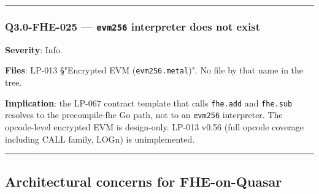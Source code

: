 \documentclass[
]{article}
\begin{document}
\begin{center}\rule{0.5\linewidth}{0.5pt}\end{center}

\subsubsection{\texorpdfstring{Q3.0-FHE-025 --- \texttt{evm256}
interpreter does not
exist}{Q3.0-FHE-025 --- evm256 interpreter does not exist}}\label{q30-fhe-025--evm256-interpreter-does-not-exist}

\textbf{Severity}: Info.

\textbf{Files}: LP-013 §"Encrypted EVM (\texttt{evm256.metal})". No file
by that name in the tree.

\textbf{Implication}: the LP-067 contract template that calls
\texttt{fhe.add} and \texttt{fhe.sub} resolves to the precompile-fhe Go
path, not to an \texttt{evm256} interpreter. The opcode-level encrypted
EVM is design-only. LP-013 v0.56 (full opcode coverage including CALL
family, LOGn) is unimplemented.

\begin{center}\rule{0.5\linewidth}{0.5pt}\end{center}

\subsection{Architectural concerns for
FHE-on-Quasar}\label{architectural-concerns-for-fhe-on-quasar}
\end{document}
